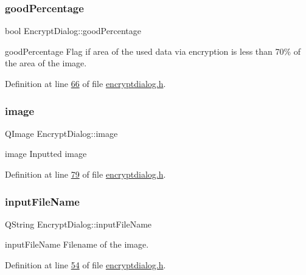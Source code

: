 \subsubsection{\texorpdfstring{good\+Percentage}{goodPercentage}}
{\footnotesize\ttfamily bool Encrypt\+Dialog\+::good\+Percentage}



good\+Percentage Flag if area of the used data via encryption is less than 70\% of the area of the image. 



Definition at line \mbox{\hyperlink{encryptdialog_8h_source_l00066}{66}} of file \mbox{\hyperlink{encryptdialog_8h_source}{encryptdialog.\+h}}.

\mbox{\label{class_encrypt_dialog_a739a0df1d28d06b28a3fd16e2bc16c73}} 
\subsubsection{\texorpdfstring{image}{image}}
{\footnotesize\ttfamily Q\+Image Encrypt\+Dialog\+::image}



image Inputted image 



Definition at line \mbox{\hyperlink{encryptdialog_8h_source_l00079}{79}} of file \mbox{\hyperlink{encryptdialog_8h_source}{encryptdialog.\+h}}.

\mbox{\label{class_encrypt_dialog_a859b1bc2f032a247632b879bf8663d0b}} 
\subsubsection{\texorpdfstring{input\+File\+Name}{inputFileName}}
{\footnotesize\ttfamily Q\+String Encrypt\+Dialog\+::input\+File\+Name}



input\+File\+Name Filename of the image. 



Definition at line \mbox{\hyperlink{encryptdialog_8h_source_l00054}{54}} of file \mbox{\hyperlink{encryptdialog_8h_source}{encryptdialog.\+h}}.

